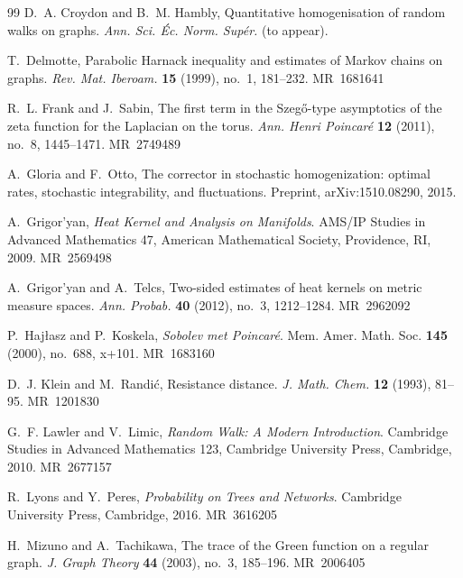 \documentclass[reqno]{amsart}
\providecommand{\MR}[1]{\textsc{MR}~#1}
\numberwithin{equation}{section}
\theoremstyle{definition}
\theoremstyle{remark}
\begin{document}
\begin{thebibliography}{99}
D.~A. Croydon and B.~M. Hambly, Quantitative homogenisation of random walks on graphs.
\emph{Ann. Sci. Éc. Norm. Supér.} (to appear).

T.~Delmotte, Parabolic Harnack inequality and estimates of Markov chains on graphs.
\emph{Rev. Mat. Iberoam.} \textbf{15} (1999), no.~1, 181--232.
\MR{1681641}

R.~L. Frank and J.~Sabin, The first term in the Szeg\H{o}-type asymptotics of the zeta function for the Laplacian on the torus.
\emph{Ann. Henri Poincar\'e} \textbf{12} (2011), no.~8, 1445--1471.
\MR{2749489}

A.~Gloria and F.~Otto, The corrector in stochastic homogenization: optimal rates, stochastic integrability, and fluctuations.
Preprint, arXiv:1510.08290, 2015.

A.~Grigor'yan, \emph{Heat Kernel and Analysis on Manifolds}.
AMS/IP Studies in Advanced Mathematics 47, American Mathematical Society, Providence, RI, 2009.
\MR{2569498}

A.~Grigor'yan and A.~Telcs, Two-sided estimates of heat kernels on metric measure spaces.
\emph{Ann. Probab.} \textbf{40} (2012), no.~3, 1212--1284.
\MR{2962092}

P.~Hajłasz and P.~Koskela, \emph{Sobolev met Poincaré}.
Mem. Amer. Math. Soc. \textbf{145} (2000), no.~688, x+101.
\MR{1683160}

D.~J. Klein and M.~Randi{\'c}, Resistance distance.
\emph{J. Math. Chem.} \textbf{12} (1993), 81--95.
\MR{1201830}

G.~F. Lawler and V.~Limic, \emph{Random Walk: A Modern Introduction}.
Cambridge Studies in Advanced Mathematics 123, Cambridge University Press, Cambridge, 2010.
\MR{2677157}

R.~Lyons and Y.~Peres, \emph{Probability on Trees and Networks}.
Cambridge University Press, Cambridge, 2016.
\MR{3616205}

H.~Mizuno and A.~Tachikawa, The trace of the Green function on a regular graph.
\emph{J. Graph Theory} \textbf{44} (2003), no.~3, 185--196.
\MR{2006405}

\end{thebibliography}
\end{document}
